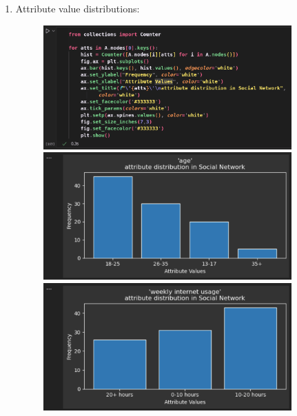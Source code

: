 \documentclass{article}
\begin{document}
\begin{enumerate}[label=(\alph*), left=10pt, itemsep=10pt]
        \item \begin{minipage}[t]{0.9\textwidth}
            Attribute value distributions:
            \begin{figure}[H]
                \centering
                \includegraphics[width=0.9\textwidth, height=0.3\textheight]{./2c.png}
                \includegraphics[width=0.9\textwidth, height=0.3\textheight]{./2ci.png}
                \includegraphics[width=0.9\textwidth, height=0.3\textheight]{./2cii.png}
            \end{figure}
        \end{minipage}
        \newpage
        \begin{minipage}[t]{0.9\textwidth}
            \begin{figure}[H]

\end{figure}
\end{minipage}
\end{enumerate}
\end{document}
